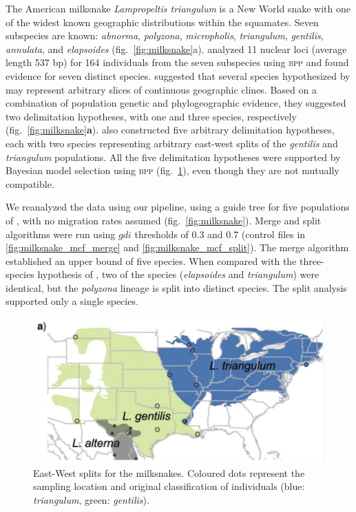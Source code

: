 \documentclass{article1}
\begin{document}
The American milksnake \textit{Lampropeltis triangulum} is a New World snake with one of
the widest known geographic distributions within the squamates.  Seven subspecies are
known: \textit{abnorma}, \textit{polyzona}, \textit{micropholis}, \textit{triangulum},
\textit{gentilis}, \textit{annulata}, and \textit{elapsoides} (fig.~\ref{fig:milksnake}a).
\citet{Ruane2014} analyzed 11 nuclear loci (average length 537 bp) for 164 individuals
from the seven subspecies using \textsc{bpp} and found evidence for seven distinct
species.  \citet{Chambers2020} suggested that several species hypothesized by
\citet{Ruane2014} may represent arbitrary slices of continuous geographic clines.  Based
on a combination of population genetic and phylogeographic evidence, they suggested two
delimitation hypotheses, with one and three species, respectively
(fig.~\ref{fig:milksnake}\textbf{a}).  \citet{Chambers2020} also constructed five
arbitrary delimitation hypotheses, each with two species representing arbitrary east-west
splits of the \textit{gentilis} and \textit{triangulum} populations.  All the five
delimitation hypotheses were supported by Bayesian model selection using \textsc{bpp}
(fig.~\ref{fig:milksnake_EW}), even though they are not mutually compatible.

We reanalyzed the data using our pipeline, using a guide tree for five populations of
\citet{Chambers2020}, with no migration rates assumed (fig.~\ref{fig:milksnake}).  Merge
and split algorithms were run using $gdi$ thresholds of 0.3 and 0.7 (control files
in \ref{fig:milksnake_mcf_merge} and \ref{fig:milksnake_mcf_split}).  The merge algorithm
established an upper bound of five species.  When compared with the three-species
hypothesis of \citet{Chambers2020}, two of the species (\textit{elapsoides} and
\textit{triangulum}) were identical, but the \textit{polyzona} lineage is split into
distinct species.  The split analysis supported only a single species.

\begin{figure}[t]
	\centering %
	\includegraphics[scale=0.5]{figs/miksnakes_EW} %
	
	\caption{East-West splits for the milksnakes.  Coloured dots represent the sampling
	location and original classification of individuals (blue: \textit{triangulum}, green:
	\textit{gentilis}). %
	} \label{fig:milksnake_EW}
\end{figure} 
\end{document}
